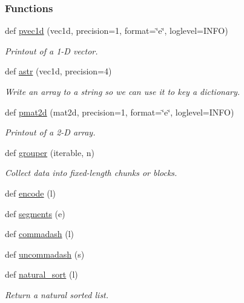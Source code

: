 \subsubsection*{Functions}
\begin{DoxyCompactItemize}
\item 
def \hyperlink{namespacesrc_1_1nifty_a34440c957989ec79bedf20e097a9e196}{pvec1d} (vec1d, precision=1, format=\char`\"{}e\char`\"{}, loglevel=I\+N\+FO)
\begin{DoxyCompactList}\small\item\em Printout of a 1-\/D vector. \end{DoxyCompactList}\item 
def \hyperlink{namespacesrc_1_1nifty_ae6848e812afbae8005b70ed48087a1f2}{astr} (vec1d, precision=4)
\begin{DoxyCompactList}\small\item\em Write an array to a string so we can use it to key a dictionary. \end{DoxyCompactList}\item 
def \hyperlink{namespacesrc_1_1nifty_a11bdf49dd8157535d935181a390cf877}{pmat2d} (mat2d, precision=1, format=\char`\"{}e\char`\"{}, loglevel=I\+N\+FO)
\begin{DoxyCompactList}\small\item\em Printout of a 2-\/D array. \end{DoxyCompactList}\item 
def \hyperlink{namespacesrc_1_1nifty_aec94a2238f5b946e64468666c9cf9671}{grouper} (iterable, n)
\begin{DoxyCompactList}\small\item\em Collect data into fixed-\/length chunks or blocks. \end{DoxyCompactList}\item 
def \hyperlink{namespacesrc_1_1nifty_a377e501a4a558c58bb2a70bae058e3e6}{encode} (l)
\item 
def \hyperlink{namespacesrc_1_1nifty_a52ca7207d5f98f2fa46954903a417402}{segments} (e)
\item 
def \hyperlink{namespacesrc_1_1nifty_a9606a594e252da08ee88b43b113f2367}{commadash} (l)
\item 
def \hyperlink{namespacesrc_1_1nifty_a6b37240e93c6469bc27fe8ef3a888763}{uncommadash} (s)
\item 
def \hyperlink{namespacesrc_1_1nifty_afbfdd73ff77aab6dc75bc793494d069f}{natural\+\_\+sort} (l)
\begin{DoxyCompactList}\small\item\em Return a natural sorted list. \end{DoxyCompactList}\item 

\end{DoxyCompactItemize}
